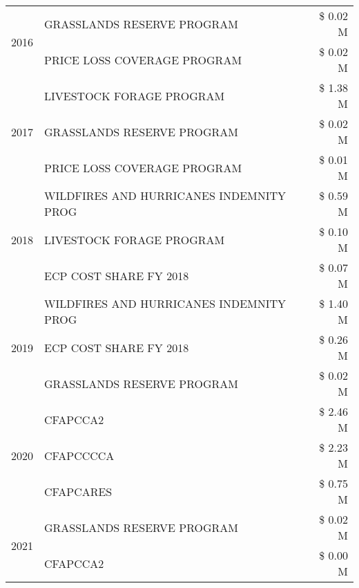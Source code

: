 \begin{tabular}{llr}
\cline{1-3}
\multirow[t]{2}{*}{2016} & GRASSLANDS RESERVE PROGRAM                    & \$ 0.02 M \\
 & PRICE LOSS COVERAGE PROGRAM                   & \$ 0.02 M \\
\cline{1-3}
\multirow[t]{3}{*}{2017} & LIVESTOCK FORAGE PROGRAM & \$ 1.38 M \\
 & GRASSLANDS RESERVE PROGRAM & \$ 0.02 M \\
 & PRICE LOSS COVERAGE PROGRAM & \$ 0.01 M \\
\cline{1-3}
\multirow[t]{3}{*}{2018} & WILDFIRES AND HURRICANES INDEMNITY PROG & \$ 0.59 M \\
 & LIVESTOCK FORAGE PROGRAM & \$ 0.10 M \\
 & ECP COST SHARE FY 2018 & \$ 0.07 M \\
\cline{1-3}
\multirow[t]{3}{*}{2019} & WILDFIRES AND HURRICANES INDEMNITY PROG & \$ 1.40 M \\
 & ECP COST SHARE FY 2018 & \$ 0.26 M \\
 & GRASSLANDS RESERVE PROGRAM & \$ 0.02 M \\
\cline{1-3}
\multirow[t]{3}{*}{2020} & CFAPCCA2 & \$ 2.46 M \\
 & CFAPCCCCA & \$ 2.23 M \\
 & CFAPCARES & \$ 0.75 M \\
\cline{1-3}
\multirow[t]{2}{*}{2021} & GRASSLANDS RESERVE PROGRAM & \$ 0.02 M \\
 & CFAPCCA2 & \$ 0.00 M \\
\cline{1-3}
\bottomrule
\end{tabular}
